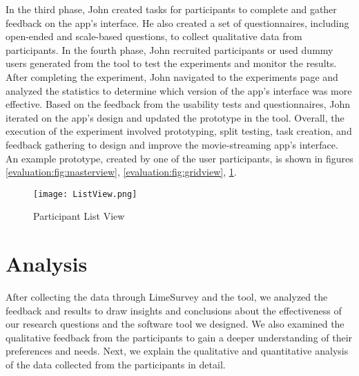 In the third phase, John created tasks for participants to complete and gather feedback on the app's interface. 
He also created a set of questionnaires, including open-ended and scale-based questions, to collect qualitative data from participants.
In the fourth phase, John recruited participants or used dummy users generated from the tool to test the experiments and monitor the results. 
After completing the experiment, John navigated to the experiments page and analyzed the statistics to determine which version of the app's interface was more effective.
Based on the feedback from the usability tests and questionnaires, John iterated on the app's design and updated the prototype in the tool. 
Overall, the execution of the experiment involved prototyping, split testing, task creation, and feedback gathering to design and improve the movie-streaming app's interface. 
An example prototype, created by one of the user participants, is shown in figures \ref{evaluation:fig:masterview}, \ref{evaluation:fig:gridview}, \ref{evaluation:fig:listview}.
\begin{figure}[ht]
  \centering
  \texttt{[image: ListView.png]}
  \caption[Example Participant Prototype - Screen3]{Participant List View}
  \label{evaluation:fig:listview}
\end{figure}
\clearpage
\section{Analysis}
\label{evaluation:section:analysis}
After collecting the data through LimeSurvey and the tool, we analyzed the feedback and results to draw insights and conclusions about the effectiveness of our research questions and the software tool we designed. 
We also examined the qualitative feedback from the participants to gain a deeper understanding of their preferences and needs. 
Next, we explain the qualitative and quantitative analysis of the data collected from the participants in detail.

